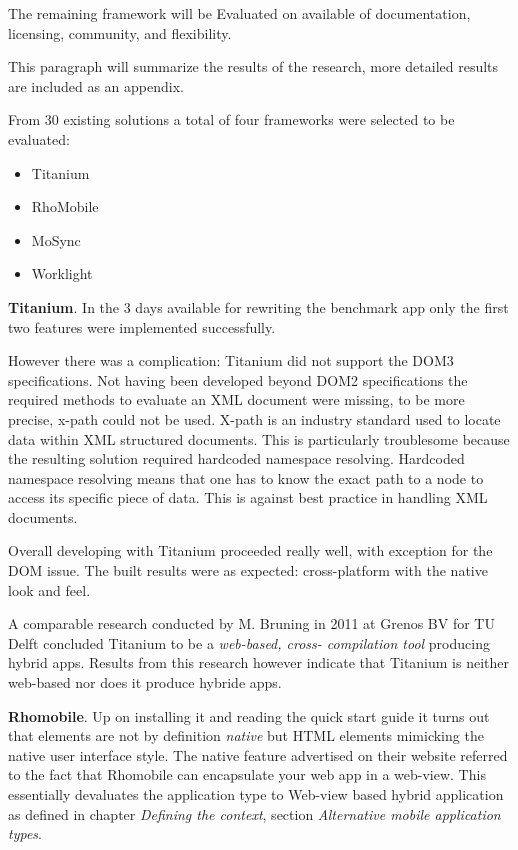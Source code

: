 The remaining framework will be Evaluated on available of documentation, licensing, community, and flexibility.

This paragraph will summarize the results of the research, more detailed results are included as an appendix. %

From 30 existing solutions a total of four frameworks were selected to be evaluated:
\begin{itemize}
	\item Titanium
	\item RhoMobile
	\item MoSync
	\item Worklight
\end{itemize}

{\bf Titanium}. In the 3 days available for rewriting the benchmark app only the first two features were implemented successfully.

However there was a complication: Titanium did not support the DOM3 specifications. Not having been developed beyond DOM2 specifications the required methods to evaluate an XML document were missing, to be more precise, x-path could not be used. X-path is an industry standard used to locate data within XML structured documents. This is particularly troublesome because the resulting solution required hardcoded namespace resolving. Hardcoded namespace resolving means that one has to know the exact path to a node to access its specific piece of data. This is against best practice in handling XML documents. 

Overall developing with Titanium proceeded really well, with exception for the DOM issue. The built results were as expected: cross-platform with the native look and feel.

A comparable research conducted by M. Bruning in 2011 at Grenos BV for TU Delft concluded Titanium to be a \emph{web-based, cross- compilation tool} producing hybrid apps.\cite{Bruning2011} Results from this research however indicate that Titanium is neither web-based nor does it produce hybride apps.

{\bf Rhomobile}. Up on installing it and reading the quick start guide it turns out that elements are not by definition \emph{native} but HTML elements mimicking the native user interface style. The native feature advertised on their website referred to the fact that Rhomobile can encapsulate your web app in a web-view. This essentially devaluates the application type to Web-view based hybrid application as defined in chapter \emph{Defining the context}, section \emph{Alternative mobile application types}.

